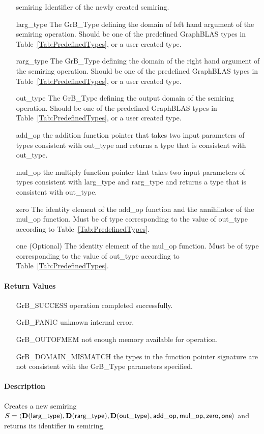 \begin{itemize}[leftmargin=1.1in]
    \item[{\sf semiring}]       Identifier of the newly created semiring.
    \item[{\sf larg\_type}]     The {\sf GrB\_Type} defining the domain of left hand argument of
    the semiring operation. Should be one of the predefined
    GraphBLAS types in Table~\ref{Tab:PredefinedTypes}, or a user created type.
    \item[{\sf rarg\_type}]     The {\sf GrB\_Type} defining the domain of the right hand 
    argument of the semiring operation. Should be one of the predefined
    GraphBLAS types in Table~\ref{Tab:PredefinedTypes}, or a user created type.
    \item[{\sf out\_type}]      The {\sf GrB\_Type} defining the output domain of the semiring
    operation. Should be one of the predefined
    GraphBLAS types in Table~\ref{Tab:PredefinedTypes}, or a user created type.
    \item[{\sf add\_op}]        the addition function pointer that takes two input parameters
    of types consistent with {\sf out\_type} and returns a type that is consistent with {\sf out\_type}.
    \item[{\sf mul\_op}]        the multiply function pointer that takes two input parameters
    of types consistent with {\sf larg\_type} and {\sf rarg\_type} and returns a type that is consistent with {\sf out\_type}.
    \item[{\sf zero}]           The identity element of the {\sf add\_op} function and the
    annihilator of the {\sf mul\_op} function.   Must be of type corresponding to the
    value of {\sf out\_type} according to Table~\ref{Tab:PredefinedTypes}.
    \item[{\sf one}]            (Optional) The identity element of the {\sf mul\_op} function. 
    Must be of type corresponding to the value of {\sf out\_type} according to
    Table~\ref{Tab:PredefinedTypes}.
\end{itemize}


\paragraph{Return Values}

\begin{itemize}[leftmargin=2.1in]
\item[{\sf GrB\_SUCCESS}]           operation completed successfully.
\item[{\sf GrB\_PANIC}]             unknown internal error.
\item[{\sf GrB\_OUTOFMEM}]          not enough memory available for operation.
\item[{\sf GrB\_DOMAIN\_MISMATCH}]  the types in the function pointer signature are not   
                                    consistent with the {\sf GrB\_Type} parameters specified.
\end{itemize}

\paragraph{Description}

Creates a new semiring $S = \langle \bold{D}({\sf larg\_type}), \bold{D}({\sf rarg\_type}), 
\bold{D}({\sf out\_type}), {\sf add\_op}, {\sf mul\_op}, {\sf zero}, {\sf one} \rangle$ and 
returns its identifier in {\sf semiring}.


